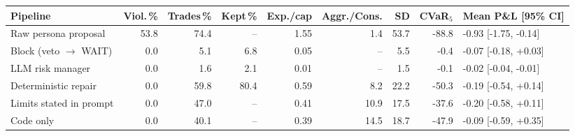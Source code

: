 \begin{tabular}{lrrrrrrrl}
\toprule
Pipeline & Viol.\,\% & Trades\,\% & Kept\,\% & Exp./cap & Aggr./Cons. & SD & CVaR$_5$ & Mean P\&L [95\% CI] \\
\midrule
Raw persona proposal & 53.8 & 74.4 & -- & 1.55 & 1.4 & 53.7 & -88.8 & -0.93 [-1.75, -0.14] \\
Block (veto $\to$ WAIT) & 0.0 & 5.1 & 6.8 & 0.05 & -- & 5.5 & -0.4 & -0.07 [-0.18, +0.03] \\
LLM risk manager & 0.0 & 1.6 & 2.1 & 0.01 & -- & 1.5 & -0.1 & -0.02 [-0.04, -0.01] \\
Deterministic repair & 0.0 & 59.8 & 80.4 & 0.59 & 8.2 & 22.2 & -50.3 & -0.19 [-0.54, +0.14] \\
Limits stated in prompt & 0.0 & 47.0 & -- & 0.41 & 10.9 & 17.5 & -37.6 & -0.20 [-0.58, +0.11] \\
Code only & 0.0 & 40.1 & -- & 0.39 & 14.5 & 18.7 & -47.9 & -0.09 [-0.59, +0.35] \\
\bottomrule
\end{tabular}
